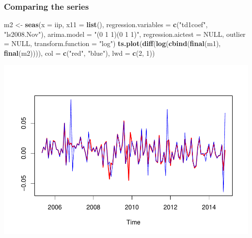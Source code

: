 \documentclass[
]{article}
\newenvironment{Shaded}{\begin{snugshade}}{\end{snugshade}}
\newcommand{\AttributeTok}[1]{\textcolor[rgb]{0.13,0.29,0.53}{#1}}
\newcommand{\ConstantTok}[1]{\textcolor[rgb]{0.56,0.35,0.01}{#1}}
\newcommand{\DecValTok}[1]{\textcolor[rgb]{0.00,0.00,0.81}{#1}}
\newcommand{\FunctionTok}[1]{\textcolor[rgb]{0.13,0.29,0.53}{\textbf{#1}}}
\newcommand{\NormalTok}[1]{#1}
\newcommand{\OtherTok}[1]{\textcolor[rgb]{0.56,0.35,0.01}{#1}}
\newcommand{\StringTok}[1]{\textcolor[rgb]{0.31,0.60,0.02}{#1}}
\begin{document}
\hypertarget{comparing-the-series}{%
\subsubsection{Comparing the series}\label{comparing-the-series}}

\begin{Shaded}
\begin{Highlighting}[]
\NormalTok{m2 }\OtherTok{\textless{}{-}} \FunctionTok{seas}\NormalTok{(}\AttributeTok{x =}\NormalTok{ iip, }\AttributeTok{x11 =} \FunctionTok{list}\NormalTok{(), }\AttributeTok{regression.variables =} \FunctionTok{c}\NormalTok{(}\StringTok{"td1coef"}\NormalTok{, }\StringTok{"ls2008.Nov"}\NormalTok{), }
           \AttributeTok{arima.model =} \StringTok{"(0 1 1)(0 1 1)"}\NormalTok{, }\AttributeTok{regression.aictest =} \ConstantTok{NULL}\NormalTok{, }\AttributeTok{outlier =} \ConstantTok{NULL}\NormalTok{, }
           \AttributeTok{transform.function =} \StringTok{"log"}\NormalTok{)}
\FunctionTok{ts.plot}\NormalTok{(}\FunctionTok{diff}\NormalTok{(}\FunctionTok{log}\NormalTok{(}\FunctionTok{cbind}\NormalTok{(}\FunctionTok{final}\NormalTok{(m1), }\FunctionTok{final}\NormalTok{(m2)))), }\AttributeTok{col =} \FunctionTok{c}\NormalTok{(}\StringTok{"red"}\NormalTok{, }\StringTok{"blue"}\NormalTok{), }
        \AttributeTok{lwd =} \FunctionTok{c}\NormalTok{(}\DecValTok{2}\NormalTok{, }\DecValTok{1}\NormalTok{))}
\end{Highlighting}
\end{Shaded}

\includegraphics{regressors_of_diwali_seasonality_for_industrial_production_files/figure-latex/unnamed-chunk-12-1.pdf}
\end{document}
